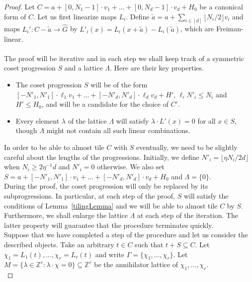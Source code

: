 \documentclass[a4paper,11pt]{article}
\numberwithin{theorem}{section}
\theoremstyle{definition}
\begin{document}
\begin{proof} Let $C = a + [0, N_1 -1 ] \cdot v_1 + \dots + [0, N_d - 1] \cdot v_d + H_0$ be a canonical form of $C$. Let us first linearize maps $L_i$. Define $\tilde{a} = a + \sum_{i \in [d]} \lfloor N_i /2 \rfloor v_i$ and maps $L_i' : C - \tilde{a} \to \hat{G}$ by $L'_i(x) = L_i(x + \tilde{a}) - L_i(\tilde{a})$, which are Freiman-linear.\\\\

The proof will be iterative and in each step we shall keep track of a symmetric coset progression $S$ and a lattice $\Lambda$. Here are their key properties.

\begin{itemize}
    \item The coset progression $S$ will be of the form $[-N'_1, N'_1] \cdot \ell_1 v_1 + \dots + [-N'_d, N'_d] \cdot \ell_d v_d + H'$, $\ell_i N'_i \leq N_i$ and $H' \leq H_0$, and will be a candidate for the choice of $C'$.
    \item Every element $\lambda$ of the lattice $\Lambda$ will satisfy $\lambda \cdot L'(x) = 0$ for all $x \in S$, though $\Lambda$ might not contain all such linear combinations.
\end{itemize}

In order to be able to almost tile $C$ with $S$ eventually, we need to be slightly careful about the lengths of the progressions. Initially, we define $N'_i = \lfloor \eta N_i /2d \rfloor$ when $N_i \geq 2\eta^{-1}d$ and $N'_i = 0$ otherwise. We also set $S = a + [-N'_1, N'_1] \cdot v_1 + \dots + [-N'_d, N'_d] \cdot v_d + H_0$ and $\Lambda = \{0\}$.\\
\indent During the proof, the coset progression will only be replaced by its subprogressions. In particular, at each step of the proof, $S$ will satisfy the conditions of Lemma~\ref{tilingLemma} and we will be able to almost tile $C$ by $S$.\\
\indent Furthermore, we shall enlarge the lattice $\Lambda$ at each step of the iteration. The latter property will guarantee that the procedure terminates quickly.\\

Suppose that we have completed a step of the procedure and let us consider the described objects. Take an arbitrary $t \in C$ such that $t + S \subseteq C$. Let $\chi_1 = L_1(t), \dots, \chi_r = L_r(t)$ and write $\Gamma = \{\chi_1, \dots, \chi_r\}$. Let $M = \{\lambda \in \mathbb{Z}^r : \lambda \cdot \chi = 0\} \subseteq \mathbb{Z}^r$ be the annihilator lattice of $\chi_1, \dots, \chi_r$.\\


\end{proof}
\end{document}
